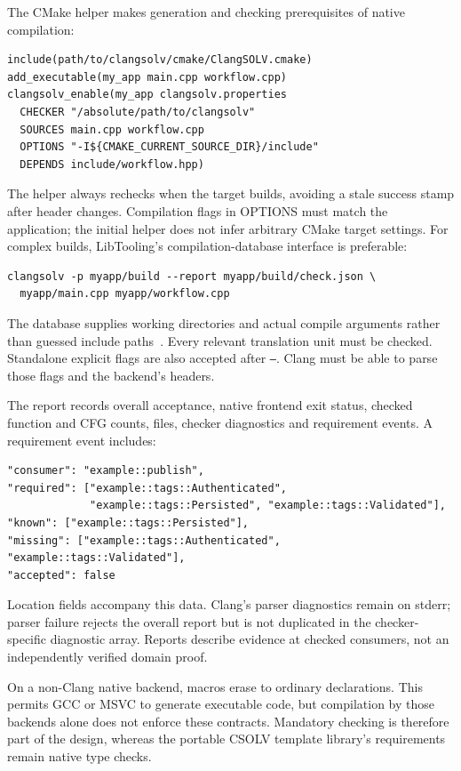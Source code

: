 \documentclass[11pt]{article}
\begin{document}
The CMake helper makes generation and checking prerequisites of native
compilation:
\begin{lstlisting}[language={}]
include(path/to/clangsolv/cmake/ClangSOLV.cmake)
add_executable(my_app main.cpp workflow.cpp)
clangsolv_enable(my_app clangsolv.properties
  CHECKER "/absolute/path/to/clangsolv"
  SOURCES main.cpp workflow.cpp
  OPTIONS "-I${CMAKE_CURRENT_SOURCE_DIR}/include"
  DEPENDS include/workflow.hpp)
\end{lstlisting}
The helper always rechecks when the target builds, avoiding a stale success
stamp after header changes. Compilation flags in OPTIONS must match the
application; the initial helper does not infer arbitrary CMake target settings.
For complex builds, LibTooling's compilation-database interface is preferable:
\begin{lstlisting}[language={}]
clangsolv -p myapp/build --report myapp/build/check.json \
  myapp/main.cpp myapp/workflow.cpp
\end{lstlisting}
The database supplies working directories and actual compile arguments rather
than guessed include paths~\cite{database}. Every relevant translation unit
must be checked. Standalone explicit flags are also accepted after
\texttt{--}. Clang must be able to parse those flags and the backend's headers.

The report records overall acceptance, native frontend exit status, checked
function and CFG counts, files, checker diagnostics and requirement events.
A requirement event includes:
\begin{lstlisting}[language={}]
"consumer": "example::publish",
"required": ["example::tags::Authenticated",
             "example::tags::Persisted", "example::tags::Validated"],
"known": ["example::tags::Persisted"],
"missing": ["example::tags::Authenticated", "example::tags::Validated"],
"accepted": false
\end{lstlisting}
Location fields accompany this data. Clang's parser diagnostics remain on
stderr; parser failure rejects the overall report but is not duplicated in
the checker-specific diagnostic array. Reports describe evidence at checked
consumers, not an independently verified domain proof.

On a non-Clang native backend, macros erase to ordinary declarations. This
permits GCC or MSVC to generate executable code, but compilation by those
backends alone does not enforce these contracts. Mandatory checking is
therefore part of the design, whereas the portable CSOLV template library's
requirements remain native type checks.
\end{document}
